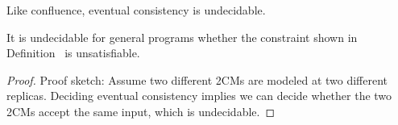Like confluence, eventual consistency is undecidable.



\begin{lemma}
It is undecidable for general \lang programs whether the constraint shown in Definition~\label{def:ec} is unsatisfiable.
\end{lemma}
\begin{proof}
Proof sketch: Assume two different 2CMs are modeled at two different replicas.  Deciding eventual consistency implies we can decide whether the two 2CMs accept the same input, which is undecidable.
\end{proof}


%

